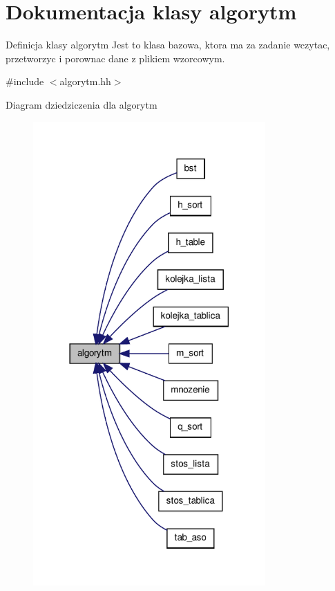 \hypertarget{classalgorytm}{\section{\-Dokumentacja klasy algorytm}
\label{classalgorytm}
}


\-Definicja klasy algorytm \-Jest to klasa bazowa, ktora ma za zadanie wczytac, przetworzyc i porownac dane z plikiem wzorcowym.  




{\ttfamily \#include $<$algorytm.\-hh$>$}



\-Diagram dziedziczenia dla algorytm\nopagebreak
\begin{figure}[H]
\begin{center}
\leavevmode
\includegraphics[width=252pt]{classalgorytm__inherit__graph}
\end{center}
\end{figure}


